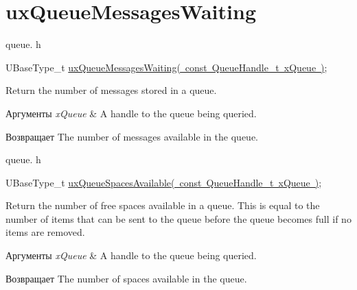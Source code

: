\hypertarget{group__ux_queue_messages_waiting}{}\section{ux\+Queue\+Messages\+Waiting}
\label{group__ux_queue_messages_waiting}
queue. h 
\begin{DoxyPre}UBaseType\_t \mbox{\hyperlink{queue_8h_add7ee0701ba35904d190811b9e5a4eda}{uxQueueMessagesWaiting( const QueueHandle\_t xQueue )}};\end{DoxyPre}


Return the number of messages stored in a queue.


\begin{DoxyParams}{Аргументы}
{\em x\+Queue} & A handle to the queue being queried.\\
\hline
\end{DoxyParams}
\begin{DoxyReturn}{Возвращает}
The number of messages available in the queue.
\end{DoxyReturn}
queue. h 
\begin{DoxyPre}UBaseType\_t \mbox{\hyperlink{queue_8h_aae75791e91707c1e0bb31d761921531c}{uxQueueSpacesAvailable( const QueueHandle\_t xQueue )}};\end{DoxyPre}


Return the number of free spaces available in a queue. This is equal to the number of items that can be sent to the queue before the queue becomes full if no items are removed.


\begin{DoxyParams}{Аргументы}
{\em x\+Queue} & A handle to the queue being queried.\\
\hline
\end{DoxyParams}
\begin{DoxyReturn}{Возвращает}
The number of spaces available in the queue. 
\end{DoxyReturn}
